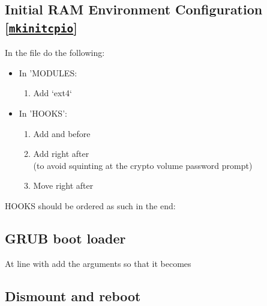 \subsection{Initial RAM Environment Configuration [\href{https://wiki.archlinux.org/index.php/mkinitcpio}{\texttt{mkinitcpio}}]}

\begin{blocksection}
	In the file do the following:
	\begin{itemize}[noitemsep,topsep=0pt,leftmargin=*]
		\item In 'MODULES:
		\begin{enumerate}
			\item Add `ext4`
		\end{enumerate}
		\item In 'HOOKS':
		\begin{enumerate}
			\item Add  and  before 
			\item Add  right after \\
			(to avoid squinting at the crypto volume password prompt)
			\item Move  right after 
		\end{enumerate}
	\end{itemize}
	HOOKS should be ordered as such in the end:\\
\end{blocksection}


\subsection{GRUB boot loader}

\begin{blocksection}
	At line with  add the arguments so that it becomes\\
\end{blocksection}

\subsection{Dismount and reboot}

